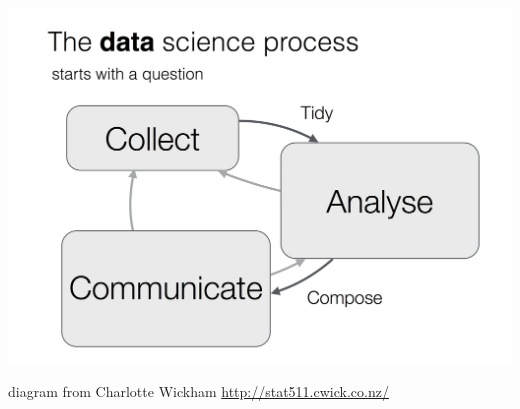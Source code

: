 \documentclass[xetex,mathserif,serif,aspectratio=169]{beamer}
\begin{document}
\begin{frame}[fragile]

\begin{center}
\includegraphics[height=0.8\textheight]{img/diagram02.jpg}
\end{center}

{\footnotesize diagram from Charlotte Wickham \url{http://stat511.cwick.co.nz/}}

\end{frame}







\end{document}
